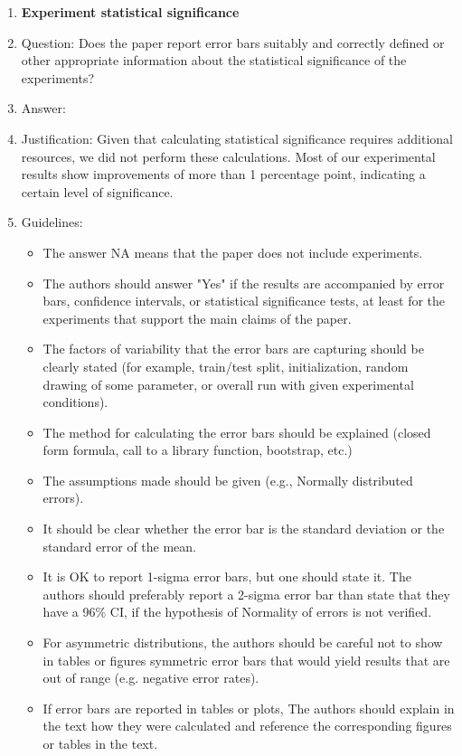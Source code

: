 \documentclass{article}
\begin{document}
\begin{enumerate}
\item {\bf Experiment statistical significance}
    \item[] Question: Does the paper report error bars suitably and correctly defined or other appropriate information about the statistical significance of the experiments?
    \item[] Answer: \answerNo{} %
    \item[] Justification: Given that calculating statistical significance requires additional resources, we did not perform these calculations. Most of our experimental results show improvements of more than 1 percentage point, indicating a certain level of significance.
    \item[] Guidelines:
    \begin{itemize}
        \item The answer NA means that the paper does not include experiments.
        \item The authors should answer "Yes" if the results are accompanied by error bars, confidence intervals, or statistical significance tests, at least for the experiments that support the main claims of the paper.
        \item The factors of variability that the error bars are capturing should be clearly stated (for example, train/test split, initialization, random drawing of some parameter, or overall run with given experimental conditions).
        \item The method for calculating the error bars should be explained (closed form formula, call to a library function, bootstrap, etc.)
        \item The assumptions made should be given (e.g., Normally distributed errors).
        \item It should be clear whether the error bar is the standard deviation or the standard error of the mean.
        \item It is OK to report 1-sigma error bars, but one should state it. The authors should preferably report a 2-sigma error bar than state that they have a 96\% CI, if the hypothesis of Normality of errors is not verified.
        \item For asymmetric distributions, the authors should be careful not to show in tables or figures symmetric error bars that would yield results that are out of range (e.g. negative error rates).
        \item If error bars are reported in tables or plots, The authors should explain in the text how they were calculated and reference the corresponding figures or tables in the text.
    \end{itemize}


\end{enumerate}
\end{document}
